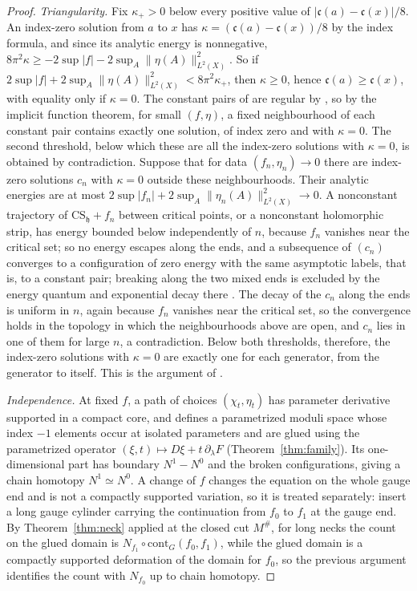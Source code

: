 \documentclass[11pt]{amsart}
\theoremstyle{definition}
\theoremstyle{remark}
\theoremstyle{plain}
\numberwithin{equation}{section}
\begin{document}
\begin{proof}
\emph{Triangularity.} Fix $\kappa_+>0$ below every positive value of
$|\mathfrak c(a)-\mathfrak c(x)|/8$. An index-zero solution from $a$ to $x$ has
$\kappa=(\mathfrak c(a)-\mathfrak c(x))/8$ by the index formula, and since its analytic
energy is nonnegative,
$8\pi^2\kappa\ge-2\sup|f|-2\sup_A\|\eta(A)\|^2_{L^2(X)}$. So if
$2\sup|f|+2\sup_A\|\eta(A)\|^2_{L^2(X)}<8\pi^2\kappa_+$, then $\kappa\ge0$, hence
$\mathfrak c(a)\ge\mathfrak c(x)$, with equality only if $\kappa=0$. The constant pairs of
\cite[Section~3.2]{DFL} are regular by \cite[Proposition~3.19]{DFL}, so by the implicit
function theorem, for small $(f,\eta)$, a fixed neighbourhood of each constant pair contains
exactly one solution, of index zero and with $\kappa=0$. The second threshold, below which
these are all the index-zero solutions with $\kappa=0$, is obtained by contradiction. Suppose
that for data $(f_n,\eta_n)\to0$ there are index-zero solutions $c_n$ with $\kappa=0$ outside
these neighbourhoods. Their analytic energies are at most
$2\sup|f_n|+2\sup_A\|\eta_n(A)\|^2_{L^2(X)}\to0$. A nonconstant trajectory of
$\mathrm{CS}_{\mathfrak h}+f_n$ between critical points, or a nonconstant holomorphic strip, has
energy bounded below independently of $n$, because $f_n$ vanishes near the critical set; so no
energy escapes along the ends, and a subsequence of $(c_n)$ converges to a configuration of zero
energy with the same asymptotic labels, that is, to a constant pair; breaking
along the two mixed ends is excluded by the energy quantum and exponential decay
there \cite[Proposition~3.6 and Section~5.4]{DFL}. The decay of the $c_n$ along
the ends is uniform in $n$, again because $f_n$ vanishes near the critical set, so the
convergence holds in the topology in which the neighbourhoods above are open, and $c_n$ lies in
one of them for large $n$, a contradiction. Below both thresholds, therefore, the index-zero
solutions with $\kappa=0$ are exactly one for each generator, from the generator to itself. This
is the argument of \cite[Theorem~3.29]{DFL}.

\emph{Independence.} At fixed $f$, a path of choices $(\chi_t,\eta_t)$ has
parameter derivative supported in a compact core, and defines a
parametrized moduli space whose index $-1$ elements occur at isolated
parameters and are glued using the parametrized operator
$(\xi,t)\mapsto D\xi+t\,\partial_\lambda F$
(Theorem~\ref{thm:family}). Its one-dimensional part has boundary
$N^1-N^0$ and the broken configurations, giving a chain homotopy
$N^1\simeq N^0$. A change of $f$ changes the equation on the whole gauge end
and is not a compactly supported variation, so it is treated separately:
insert a long gauge cylinder carrying the continuation from $f_0$ to $f_1$ at
the gauge end. By Theorem~\ref{thm:neck} applied at the closed cut $M^\#$, for
long necks the count on the glued domain is $N_{f_1}\circ \mathrm{cont}_G(f_0,f_1)$, while
the glued domain is a compactly supported deformation of the domain for
$f_0$, so the previous argument identifies the count with $N_{f_0}$ up to
chain homotopy.
\end{proof}
\end{document}
